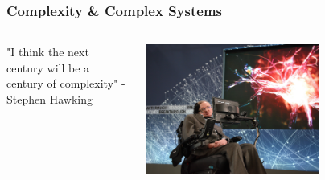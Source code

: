\documentclass{beamer}
\begin{document}
   \begin{frame}
   	\frametitle{Complexity \& Complex Systems}
   
   	 \begin{columns}
   		\begin{column}{0.5\textwidth}
   			
   			"I think the next century will be a century of complexity" - Stephen Hawking
   			
   		\end{column}
   		\begin{column}{0.5\textwidth} 
   			\begin{center}
   				\includegraphics[width=0.65\textwidth]{images/stephen-hawking.jpg}
   			\end{center}
   		\end{column}
   	\end{columns}
     \end{frame}
 
\end{document}
